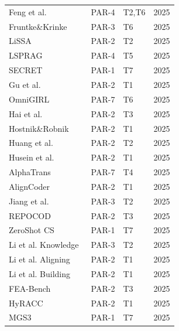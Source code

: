 \begin{longtable}{p{5cm}p{1.2cm}p{1.5cm}r}
Feng et al.~\cite{feng2025integrating}            & PAR-4 & T2,T6    & 2025 \\
Fruntke\&Krinke~\cite{fruntke2025automatically}   & PAR-3 & T6       & 2025 \\
LiSSA~\cite{fuchss2025lissa}                      & PAR-2 & T2       & 2025 \\
LSPRAG~\cite{go2025lsprag}                        & PAR-4 & T5       & 2025 \\
SECRET~\cite{gu2025secret}                        & PAR-1 & T7       & 2025 \\
Gu et al.~\cite{gu2025what}                       & PAR-2 & T1       & 2025 \\
OmniGIRL~\cite{guo2025omnigirl}                   & PAR-7 & T6       & 2025 \\
Hai et al.~\cite{hai2025impacts}                  & PAR-2 & T3       & 2025 \\
Hostnik\&Robnik~\cite{hostnik2025retrieval}        & PAR-2 & T1       & 2025 \\
Huang et al.~\cite{huang2025back}                 & PAR-2 & T2       & 2025 \\
Husein et al.~\cite{husein2025codecompletion}      & PAR-2 & T1       & 2025 \\
AlphaTrans~\cite{ibrahimzada2025alphatrans}        & PAR-7 & T4       & 2025 \\
AlignCoder~\cite{jiang2025aligncoder}             & PAR-2 & T1       & 2025 \\
Jiang et al.~\cite{jiang2025issue}                & PAR-3 & T2       & 2025 \\
REPOCOD~\cite{liang2025repocod}                   & PAR-2 & T3       & 2025 \\
ZeroShot CS~\cite{liang2025zeroshot}              & PAR-1 & T7       & 2025 \\
Li et al. Knowledge~\cite{li2025knowledge}        & PAR-3 & T2       & 2025 \\
Li et al. Aligning~\cite{li2025aligning}          & PAR-2 & T1       & 2025 \\
Li et al. Building~\cite{li2025building}          & PAR-2 & T1       & 2025 \\
FEA-Bench~\cite{li2025feabench}                   & PAR-2 & T3       & 2025 \\
HyRACC~\cite{li2025hyracc}                        & PAR-2 & T1       & 2025 \\
MGS3~\cite{li2025mgs3}                           & PAR-1 & T7       & 2025 \\

\end{longtable}
